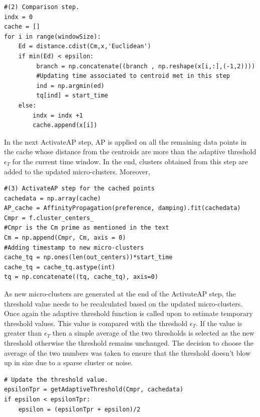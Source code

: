 \begin{lstlisting}
#(2) Comparison step. 
indx = 0
cache = []
for i in range(windowSize):
    Ed = distance.cdist(Cm,x,'Euclidean')     
    if min(Ed) < epsilon:
         branch = np.concatenate((branch , np.reshape(x[i,:],(-1,2)))) 
         #Updating time associated to centroid met in this step
         ind = np.argmin(ed)          
         tq[ind] = start_time
    else:
        indx = indx +1
        cache.append(x[i])       

\end{lstlisting}


In the next ActivateAP step, AP is applied on all the remaining data points in the cache whose distance from the centroids are more than the adaptive threshold $\epsilon_T$ for the current time window. In the end, clusters obtained from this step are added to the updated micro-clusters. Moreover, 


\begin{lstlisting}
#(3) ActivateAP step for the cached points
cachedata = np.array(cache)        
AP_cache = AffinityPropagation(preference, damping).fit(cachedata)
Cmpr = f.cluster_centers_
#Cmpr is the Cm prime as mentioned in the text
Cm = np.append(Cmpr, Cm, axis = 0)
#Adding timestamp to new micro-clusters  
cache_tq = np.ones(len(out_centers))*start_time
cache_tq = cache_tq.astype(int)
tq = np.concatenate((tq, cache_tq), axis=0)
\end{lstlisting}


As new micro-clusters are generated at the end of the ActivateAP step, the threshold value needs to be recalculated based on the updated micro-clusters. Once again the adaptive threshold function is called upon to estimate temporary threshold values. This value is compared with the threshold $\epsilon_T$. If the value is greater than $\epsilon_T$ then a simple average of the two thresholds is selected as the new threshold otherwise the threshold remains unchanged. The decision to choose the average of the two numbers was taken to ensure that the threshold doesn't blow up in size due to a sparse cluster or noise.
\begin{lstlisting}
# Update the threshold value.
epsilonTpr = getAdaptiveThreshold(Cmpr, cachedata)
if epsilon < epsilonTpr:
    epsilon = (epsilonTpr + epsilon)/2  
\end{lstlisting}

